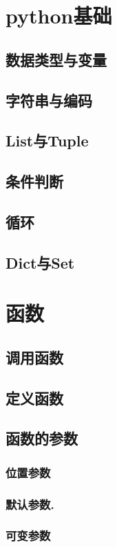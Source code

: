 \section{python基础}
\subsection{数据类型与变量}
\subsection{字符串与编码}
\subsection{List与Tuple}
\subsection{条件判断}
\subsection{循环}
\subsection{Dict与Set}

\newpage
\section{函数}
\subsection{调用函数}
\subsection{定义函数}
\subsection{函数的参数}
\subsubsection{位置参数}
\subsubsection{默认参数.}
\subsubsection{可变参数}
